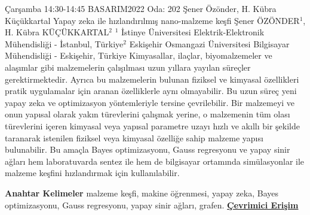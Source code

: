 
    \begin{abstract_basarim}
    {Çarşamba 14:30-14:45}
    {BASARIM2022}
    {Oda: 202}
    {Şener Özönder, H. Kübra Küçükkartal}
    {Yapay zeka ile hızlandırılmış nano-malzeme keşfi}
    {%
    Şener ÖZÖNDER$^{1}$, H. Kübra KÜÇÜKKARTAL$^{2}$}
    {%
    }
    {%
    $^1$ İstinye Üniversitesi Elektrik-Elektronik Mühendisliği - İstanbul, Türkiye\newline{}$^2$ Eskişehir Osmangazi Üniversitesi Bilgisayar Mühendisliği - Eskişehir, Türkiye}
    Kimyasallar, ilaçlar, biyomalzemeler ve alaşımlar gibi malzemelerin çalışılması uzun yıllara yayılan süreçler gerektirmektedir. Ayrıca bu malzemelerin bulunan fiziksel ve kimyasal özellikleri pratik uygulamalar için aranan özelliklerle aynı olmayabilir. Bu uzun süreç yeni yapay zeka ve optimizasyon yöntemleriyle tersine çevrilebilir. Bir malzemeyi ve onun yapısal olarak yakın türevlerini çalışmak yerine, o malzemenin tüm olası türevlerini içeren kimyasal veya yapısal parametre uzayı hızlı ve akıllı bir şekilde taranarak istenilen fiziksel veya kimyasal özelliğe sahip malzeme yapısı bulunabilir. Bu amaçla Bayes optimizasyonu, Gauss regresyonu ve yapay sinir ağları hem laboratuvarda sentez ile hem de bilgisayar ortamında simülasyonlar ile malzeme keşfini hızlandırmak için kullanılabilir. 
    
            \textbf{Anahtar Kelimeler} \newline{}malzeme keşfi, makine öğrenmesi, yapay zeka, Bayes optimizasyonu, Gauss regresyonu, yapay sinir ağları, grafen.
     \newline\newline\noindent \href{https://drive.google.com/file/d/1GF296mBNrqbRUvTzV5Qk8CS8uNqUE2bZ/view?usp=drivesdk}{\bfseries Çevrimici Erişim}
    \end{abstract_basarim}
    